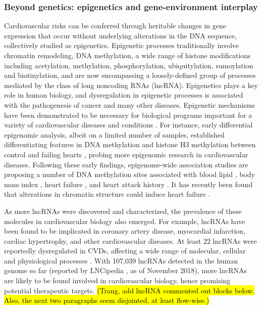 \documentclass[letter]{bioinfo}
\begin{document}
\subsubsection*{Beyond genetics: epigenetics and gene-environment interplay}	
	Cardiovascular risks can be conferred through heritable changes in gene expression that occur without underlying alterations in the DNA sequence, collectively studied as epigenetics. Epigenetic processes traditionally involve chromatin remodeling, DNA methylation, a wide range of histone modifications including acetylation, methylation, phosphorylation, ubiquitylation, sumoylation and biotinylation, and are now encompassing a loosely-defined group of processes mediated by the class of long noncoding RNAs (lncRNA). Epigenetics plays a key role in human biology, and dysregulation in epigenetic processes is associated with the pathogenesis of cancer and many other diseases. Epigenetic mechanisms have been demonstrated to be necessary for biological programs important for a variety of cardiovascular diseases and conditions \citep{Udali:2013:Cardiovascular,AbiKhalil:2014:emerging,Muka:2016:role,Gidlof:2016:Ischemic}.
	For instance, early differential epigenomic analysis, albeit on a limited number of samples, established differentiating features in DNA methylation and histone H3 methylation between control and failing hearts \citep{Movassagh:2011:Distinct}, probing more epigenomic research in cardiovascular diseases. Following these early findings, epigenome-wide association studies are proposing a number of DNA methylation sites associated with blood lipid \citep{Irvin:2014:Epigenomewide}, body mass index \citep{Dick:2014:DNA, Wahl:2017:Epigenomewide}, heart failure \citep{Meder:2017:EpigenomeWide}, and heart attack history \citep{Rask-Andersen:2016:Epigenomewide}. It has recently been found that alterations in chromatin structure could induce heart failure \citep{Rosa-Garrido:2017:HighResolution}.
	
	As more lncRNAs were discovered and characterized, the prevalence of these molecules in cardiovascular biology also emerged. For example, lncRNAs have been found to be implicated in coronary artery disease, myocardial infarction, cardiac hypertrophy, and other cardiovascular diseases. At least 22 lncRNAs were reportedly dysregulated in CVDs, affecting a wide range of molecular, cellular and physiological processes \citep{Das:2018:Deciphering}. With 107,039 lncRNAs detected in the human genome so far (reported by LNCipedia \citep{Volders:2018:LNCipedia}, as of November 2018), more lncRNAs are likely to be found involved in cardiovascular biology, hence promising potential therapeutic targets. \hl{(Trang, add lncRNA commented out blocks below.  Also, the next two paragraphs seem disjointed, at least flow-wise.)}
	
\end{document}
